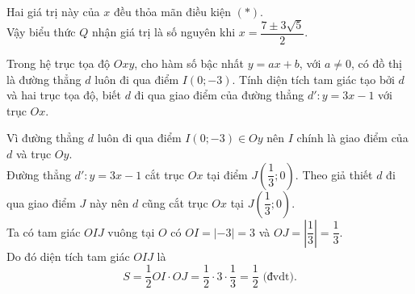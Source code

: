 \begin{bt}
{\begin{enumerate}
\begin{eqnarray*}
   \end{eqnarray*}
   Hai giá trị này của $x$ đều thỏa mãn điều kiện $(*)$.\\
   Vậy biểu thức $Q$ nhận giá trị là số nguyên khi $x=\dfrac{7 \pm 3\sqrt{5}}{2}$.
  \end{enumerate}
  }
\end{bt}

\begin{bt}%
 Trong hệ trục tọa độ $Oxy$, cho hàm số bậc nhất $y=ax+b$, với $a \neq 0$, có đồ thị là đường thẳng $d$ luôn đi qua điểm $I(0;-3)$. Tính diện tích tam giác tạo bởi $d$ và hai trục tọa độ, biết $d$ đi qua giao điểm của đường thẳng $d'\colon y=3x-1$ với trục $Ox$.
 \loigiai
  {
  \immini
  {
  Vì đường thẳng $d$ luôn đi qua điểm $I(0;-3) \in Oy$ nên $I$ chính là giao điểm của $d$ và trục $Oy$.\\
  Đường thẳng $d'\colon y=3x-1$ cắt trục $Ox$ tại điểm $J\left(\dfrac{1}{3};0\right)$. Theo giả thiết $d$ đi qua giao điểm $J$ này nên $d$ cũng cắt trục $Ox$ tại $J\left(\dfrac{1}{3};0\right)$.\\
  Ta có tam giác $OIJ$ vuông tại $O$ có $OI = |-3|=3$ và $OJ=\left|\dfrac{1}{3}\right| = \dfrac{1}{3}$.\\
  Do đó diện tích tam giác $OIJ$ là
  $$S = \dfrac{1}{2}OI \cdot OJ = \dfrac{1}{2} \cdot 3 \cdot \dfrac{1}{3} = \dfrac{1}{2} \text{ (đvdt)}.$$
  }
  {
  }
  }
\end{bt}

